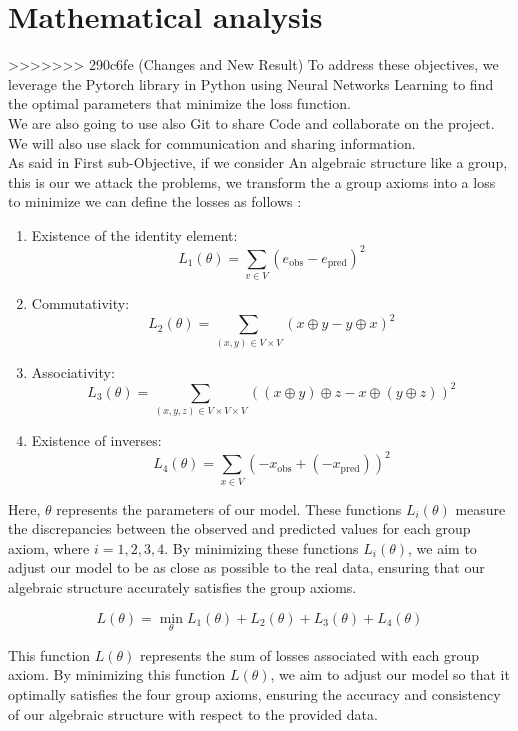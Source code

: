 \documentclass{report}
\begin{document}
\section{Mathematical analysis}
>>>>>>> 290c6fe (Changes and New Result)
    To address these objectives, we leverage
    the Pytorch library in Python using Neural Networks Learning to find the optimal parameters that minimize the loss function.\\
    We are also going to use also Git to share Code and collaborate on the project.\\ 
    We will also use slack for communication and sharing information.\\

    As said in  First sub-Objective, if we consider An algebraic structure like a group, this is our we attack the problems, we transform the a group axioms into a loss to minimize we can define the losses as follows : 

    \begin{enumerate}
        \item Existence of the identity element:  \[
            L_1(\theta) = \sum_{v \in V} (e_{\text{obs}} - e_{\text{pred}})^2
            \]
        \item Commutativity:
        \[
        L_2(\theta) = \sum_{(x, y) \in V \times V} (x \oplus y - y \oplus x)^2
        \]
        \item Associativity:
        \[
        L_3(\theta) = \sum_{(x, y, z) \in V \times V \times V} ((x \oplus y) \oplus z - x \oplus (y \oplus z))^2
        \]
        \item Existence of inverses:
        \[
        L_4(\theta) = \sum_{x \in V} (-x_{\text{obs}} + (-x_{\text{pred}}))^2
        \] 
    \end{enumerate}
    
    Here, $\theta$ represents the parameters of our model.
    These functions $L_i(\theta)$ measure the discrepancies
    between the observed and predicted values for each group 
    axiom, where $i = 1, 2, 3, 4$. By minimizing these functions
    $L_i(\theta)$, we aim to adjust our model to be as close as
    possible to the real data, ensuring that our algebraic 
    structure accurately satisfies the group axioms. 

    $$
    L(\theta) = \min_{\theta} L_1(\theta) + L_2(\theta) + L_3(\theta) + L_4(\theta)
    $$


    This function $L(\theta)$ represents the sum of losses 
    associated with each group axiom. By minimizing 
    this function $L(\theta)$, we aim to adjust our model so
    that it optimally satisfies the four group axioms, 
    ensuring the accuracy and consistency of our 
    algebraic structure with respect to the provided data.\\
\end{document}
